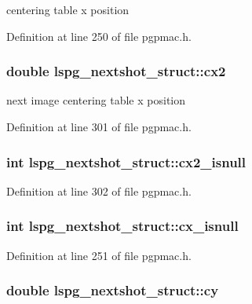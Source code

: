 centering table x position 



Definition at line 250 of file pgpmac.\-h.

\hypertarget{structlspg__nextshot__struct_a10d45763100bc59f9a5f68f1b48db6d3}{
\subsubsection[{cx2}]{\setlength{\rightskip}{0pt plus 5cm}double lspg\-\_\-nextshot\-\_\-struct\-::cx2}}\label{structlspg__nextshot__struct_a10d45763100bc59f9a5f68f1b48db6d3}


next image centering table x position 



Definition at line 301 of file pgpmac.\-h.

\hypertarget{structlspg__nextshot__struct_a3ad947f4efe2cb5c338244b019334749}{
\subsubsection[{cx2\-\_\-isnull}]{\setlength{\rightskip}{0pt plus 5cm}int lspg\-\_\-nextshot\-\_\-struct\-::cx2\-\_\-isnull}}\label{structlspg__nextshot__struct_a3ad947f4efe2cb5c338244b019334749}


Definition at line 302 of file pgpmac.\-h.

\hypertarget{structlspg__nextshot__struct_a779b99533f0ed4e659177afb0b791ad2}{
\subsubsection[{cx\-\_\-isnull}]{\setlength{\rightskip}{0pt plus 5cm}int lspg\-\_\-nextshot\-\_\-struct\-::cx\-\_\-isnull}}\label{structlspg__nextshot__struct_a779b99533f0ed4e659177afb0b791ad2}


Definition at line 251 of file pgpmac.\-h.

\hypertarget{structlspg__nextshot__struct_ab7a7b37a17f06c4e9ebdcdf056946098}{
\subsubsection[{cy}]{\setlength{\rightskip}{0pt plus 5cm}double lspg\-\_\-nextshot\-\_\-struct\-::cy}}\label{structlspg__nextshot__struct_ab7a7b37a17f06c4e9ebdcdf056946098}


